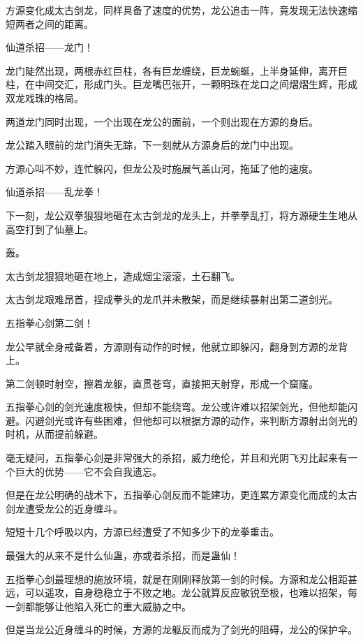
\begin{this_body}

方源变化成太古剑龙，同样具备了速度的优势，龙公追击一阵，竟发现无法快速缩短两者之间的距离。

仙道杀招——龙门！

龙门陡然出现，两根赤红巨柱，各有巨龙缠绕，巨龙蜿蜒，上半身延伸，离开巨柱，在中间交汇，形成门头。巨龙嘴巴张开，一颗明珠在龙口之间熠熠生辉，形成双龙戏珠的格局。

两道龙门同时出现，一个出现在龙公的面前，一个则出现在方源的身后。

龙公踏入眼前的龙门消失无踪，下一刻就从方源身后的龙门中出现。

方源心叫不妙，连忙躲闪，但龙公及时施展气盖山河，拖延了他的速度。

仙道杀招——乱龙拳！

下一刻，龙公双拳狠狠地砸在太古剑龙的龙头上，并拳拳乱打，将方源硬生生地从高空打到了仙墓上。

轰。

太古剑龙狠狠地砸在地上，造成烟尘滚滚，土石翻飞。

太古剑龙艰难昂首，捏成拳头的龙爪并未散架，而是继续暴射出第二道剑光。

五指拳心剑第二剑！

龙公早就全身戒备着，方源刚有动作的时候，他就立即躲闪，翻身到方源的龙背上。

第二剑顿时射空，擦着龙躯，直贯苍穹，直接把天射穿，形成一个窟窿。

五指拳心剑的剑光速度极快，但却不能绕弯。龙公或许难以招架剑光，但他却能闪避。闪避剑光或许有些困难，但他却可以根据方源的动作，来判断方源射出剑光的时机，从而提前躲避。

毫无疑问，五指拳心剑是非常强大的杀招，威力绝伦，并且和光阴飞刃比起来有一个巨大的优势——它不会自我遗忘。

但是在龙公明确的战术下，五指拳心剑反而不能建功，更连累方源变化而成的太古剑龙遭受龙公的近身缠斗。

短短十几个呼吸以内，方源已经遭受了不知多少下的龙拳重击。

最强大的从来不是什么仙蛊，亦或者杀招，而是蛊仙！

五指拳心剑最理想的施放环境，就是在刚刚释放第一剑的时候。方源和龙公相距甚远，可以遥攻，自身稳稳立于不败之地。龙公就算反应敏锐至极，也难以招架，每一剑都能够让他陷入死亡的重大威胁之中。

但是当龙公近身缠斗的时候，方源的龙躯反而成为了剑光的阻碍，龙公的保护伞。


\end{this_body}
